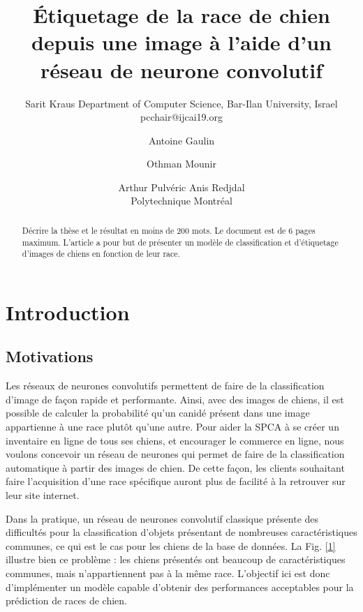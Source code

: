 \documentclass{article}
\title{Étiquetage de la race de chien depuis une image à l'aide d'un réseau de neurone convolutif}
\author{
    Sarit Kraus
    \affiliations
    Department of Computer Science, Bar-Ilan University, Israel \emails
    pcchair@ijcai19.org
}
\author{
Antoine Gaulin\and
Othman Mounir\and
Arthur Pulvéric\And
Anis Redjdal\\
\affiliations
Polytechnique Montréal\\
}
\begin{document}
\maketitle

\begin{abstract}
Décrire la thèse et le résultat en moins de 200 mots. Le document est de 6 pages maximum.
L'article a pour but de présenter un modèle de classification et d'étiquetage d'images
de chiens en fonction de leur race.
\end{abstract}

\section{Introduction}

\subsection{Motivations}

Les réseaux de neurones convolutifs permettent de faire de la classification d'image
de façon rapide et performante. Ainsi, avec des images de chiens, il est possible de
calculer la probabilité qu'un canidé présent dans une image appartienne à une race
plutôt qu’une autre. Pour aider la SPCA à se créer un inventaire en ligne de tous 
ses chiens, et encourager le commerce en ligne, nous voulons concevoir un réseau
de neurones qui permet de faire de la classification automatique à partir des images
de chien. De cette façon, les clients souhaitant faire l'acquisition d'une race
spécifique auront plus de facilité à la retrouver sur leur site internet.

Dans la pratique, un réseau de neurones convolutif classique présente des
difficultés pour la classification d’objets présentant de nombreuses caractéristiques
communes, ce qui est le cas pour les chiens de la base de données. La Fig. \ref{1}
illustre bien ce problème : les chiens présentés ont beaucoup de caractéristiques
communes, mais n’appartiennent pas à la même race. L’objectif ici est donc
d’implémenter un modèle capable d’obtenir des performances acceptables pour
la prédiction de races de chien.
\end{document}
